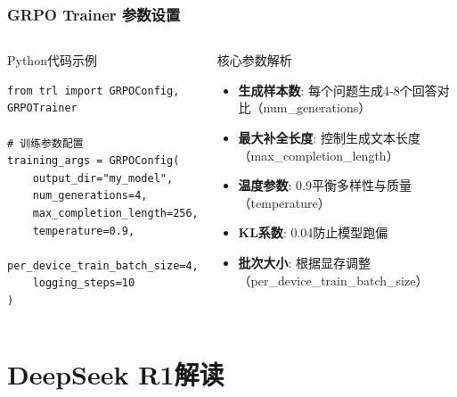 \documentclass[10pt,aspectratio=169]{beamer}
\begin{document}
\begin{frame}[fragile]
    \frametitle{GRPO Trainer 参数设置}
    \begin{columns}[T]
        \begin{block}{Python代码示例}
            \begin{lstlisting}[basicstyle=\small]
from trl import GRPOConfig, GRPOTrainer

# 训练参数配置
training_args = GRPOConfig(
    output_dir="my_model",
    num_generations=4,
    max_completion_length=256,
    temperature=0.9,
    per_device_train_batch_size=4,
    logging_steps=10
)
            \end{lstlisting}
        \end{block}
        
        \begin{block}{核心参数解析}
            \begin{itemize}
                \item \textbf{生成样本数}: 每个问题生成4-8个回答对比（num\_generations）
                \item \textbf{最大补全长度}: 控制生成文本长度（max\_completion\_length）
                \item \textbf{温度参数}: 0.9平衡多样性与质量（temperature）
                \item \textbf{KL系数}: 0.04防止模型跑偏
                \item \textbf{批次大小}: 根据显存调整（per\_device\_train\_batch\_size）
            \end{itemize}
        \end{block}


    \end{columns}
\end{frame}

\section{DeepSeek R1解读}
\end{document}
